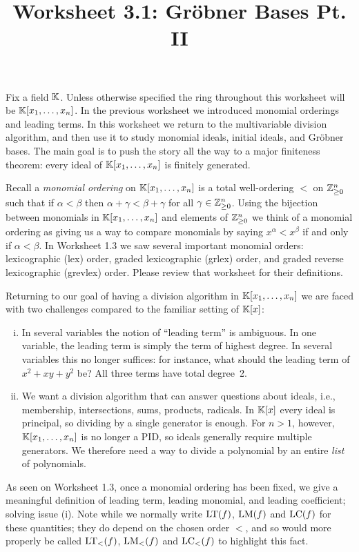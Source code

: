 \documentclass[12pt,reqno]{amsart}
\title{Worksheet 3.1: Gr\"obner Bases Pt. II}
\begin{document}

\maketitle
\thispagestyle{firstpageIP}

Fix a field $\mathbb{K}$. Unless otherwise specified the ring throughout this worksheet will be $\mathbb{K}[x_1,\ldots,x_n]$. In the previous worksheet we introduced monomial orderings and leading terms. In this worksheet we return to the multivariable division algorithm, and then use it to study monomial ideals, initial ideals, and Gr\"obner bases. The main goal is to push the story all the way to a major finiteness theorem: every ideal of $\mathbb{K}[x_1,\ldots,x_n]$ is finitely generated.

Recall a \emph{monomial ordering} on $\mathbb{K}[x_1,\ldots,x_n]$ is a total well-ordering $<$ on $\mathbb{Z}^{n}_{\geq0}$ such that if $\alpha < \beta$ then $\alpha + \gamma < \beta+\gamma$ for all $\gamma \in \mathbb{Z}^{n}_{\geq0}$. Using the bijection between monomials in $\mathbb{K}[x_1,\ldots,x_n]$  and elements of $\mathbb{Z}^{n}_{\geq0}$ we think of a monomial ordering as giving us a way to compare monomials by saying $x^{\alpha} < x^{\beta}$ if and only if $\alpha < \beta$. In Worksheet 1.3 we saw several important monomial orders: lexicographic (lex) order, graded lexicographic (grlex) order, and graded reverse lexicographic (grevlex) order. Please review that worksheet for their definitions. 

Returning to our goal of having a division algorithm in $\mathbb{K}[x_1,\ldots,x_n]$ we are faced with two challenges compared to the familiar setting of $\mathbb{K}[x]$: 
\begin{enumerate}[(i)]
\item  In several variables the notion of ``leading term'' is ambiguous. In one variable, the leading term is simply the term of highest degree. In several variables this no longer suffices: for instance, what should the leading term of $x^2+xy+y^2$ be? All three terms have total degree~2.
\item  We want a division algorithm that can answer questions about ideals, i.e., membership, intersections, sums, products, radicals. In $\mathbb{K}[x]$ every ideal is principal, so dividing by a single generator is enough. For $n>1$, however, $\mathbb{K}[x_1,\ldots,x_n]$ is no longer a PID, so ideals generally require multiple generators. We therefore need a way to divide a polynomial by an entire \emph{list} of polynomials.
\end{enumerate}
As seen on Worksheet 1.3, once a monomial ordering has been fixed, we give a meaningful definition of leading term, leading monomial, and leading coefficient; solving issue (i). Note while we normally write $\operatorname{LT}(f)$, $\operatorname{LM}(f)$ and $\operatorname{LC}(f)$ for these quantities; they do depend on the chosen order $<$, and so would more properly be called $\operatorname{LT}_{<}(f)$, $\operatorname{LM}_{<}(f)$ and $\operatorname{LC}_{<}(f)$ to highlight this fact. 
\end{document}
